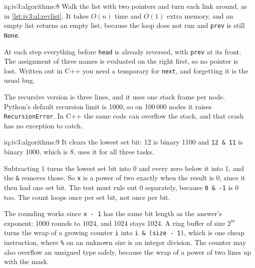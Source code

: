 \begin{solution}{iq:iv3:algorithms:8}
Walk the list with two pointers and turn each link around, as in \cref{lst:iv3:al:revlist}. It takes $O(n)$ time and $O(1)$ extra memory, and an empty list returns an empty list, because the loop does not run and \texttt{prev} is still \texttt{None}.
\enlargethispage{-3\baselineskip}%
\label{lst:iv3:al:revlist}

At each step everything before \texttt{head} is already reversed, with \texttt{prev} at its front. The assignment of three names is evaluated on the right first, so no pointer is lost. Written out in C++ you need a temporary for \texttt{next}, and forgetting it is the usual bug.

The recursive version is three lines, and it uses one stack frame per node. Python's default recursion limit is 1000, so on 100\,000 nodes it raises \texttt{RecursionError}. In C++ the same code can overflow the stack, and that crash has no exception to catch.

\end{solution}

\begin{solution}{iq:iv3:algorithms:9}
It clears the lowest set bit: 12 is binary 1100 and \texttt{12 \& 11} is binary 1000, which is 8.  uses it for all three tasks.
\label{lst:iv3:al:bits}

Subtracting 1 turns the lowest set bit into 0 and every zero below it into 1, and the \texttt{\&} removes those. So \texttt{x} is a power of two exactly when the result is 0, since it then had one set bit. The test must rule out 0 separately, because \texttt{0 \& -1} is 0 too. The count loops once per set bit, not once per bit.

The rounding works since \texttt{x - 1} has the same bit length as the answer's exponent: 1000 rounds to 1024, and 1024 stays 1024. A ring buffer of size $2^m$ turns the wrap of a growing counter \texttt{i} into \texttt{i \& (size - 1)}, which is one cheap instruction, where \texttt{\%} on an unknown size is an integer division. The counter may also overflow an unsigned type safely, because the wrap of a power of two lines up with the mask.

\end{solution}

